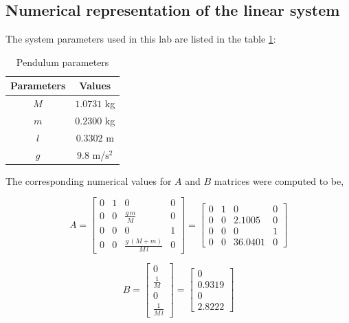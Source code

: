 \documentclass[10pt]{article}
\begin{document}
\subsection{Numerical representation of the linear system}
The system parameters used in this lab are listed in the table \ref{tab:sys_param}:
\begin{table}[h]
    \centering
    \begin{tabular}{c|c}
    \textbf{Parameters} & \textbf{Values} \\
    \hline
         $M$ & $1.0731$ kg \\
         $m$ & $0.2300$ kg \\
         $l$ & $0.3302$ m \\
         $g$ & $9.8$ m/$\text{s}^2$
    \end{tabular}
    \caption{Pendulum parameters}
    \label{tab:sys_param}
\end{table}

The corresponding numerical values for $A$ and $B$ matrices were computed to be,

\begin{equation*}
    A = \begin{bmatrix} 0 & 1 & 0 & 0\\ 0 & 0 & \frac{g\,m}{M} & 0\\ 0 & 0 & 0 & 1\\ 0 & 0 & \frac{g\,\left(M+m\right)}{M\,l} & 0 \end{bmatrix} = \begin{bmatrix} 0 & 1 & 0 & 0\\ 0 & 0 & 2.1005 & 0\\ 0 & 0 & 0 & 1\\ 0 & 0 & 36.0401 & 0 \end{bmatrix}
\end{equation*}

\begin{equation*}
    B = \begin{bmatrix} 0\\ \frac{1}{M}\\ 0\\ \frac{1}{M\,l} \end{bmatrix} = \begin{bmatrix} 0\\ 0.9319\\ 0\\ 2.8222 \end{bmatrix}
\end{equation*}
\end{document}
